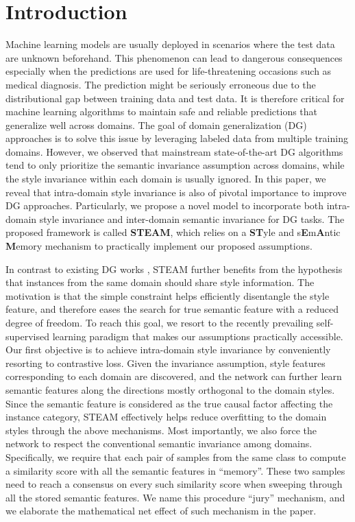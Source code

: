 \documentclass[10pt,twocolumn,letterpaper]{article}
\newcommand{\0}{{\bf 0}}
\begin{document}
\section{Introduction}
Machine learning models are usually deployed in scenarios where the test data are unknown beforehand. This phenomenon can lead to dangerous consequences especially when the predictions are used for life-threatening occasions such as medical diagnosis. The prediction might be seriously erroneous due to the distributional gap between training data and test data. It is therefore critical for machine learning algorithms to maintain safe and reliable predictions that generalize well across domains. The goal of domain generalization (DG) approaches \cite{li2018domain, li2018deep, shankar2018generalizing, zhou2021domain} is to solve this issue by leveraging labeled data from multiple training domains. However, we observed that mainstream state-of-the-art DG algorithms tend to only prioritize the semantic invariance assumption across domains, while the style invariance within each domain is usually ignored. In this paper, we reveal that intra-domain style invariance is also of pivotal importance to improve DG approaches. Particularly, we propose a novel model to incorporate both intra-domain style invariance and inter-domain semantic invariance for DG tasks. The proposed framework is called \textbf{STEAM}, which relies on a \textbf{ST}yle and s\textbf{E}m\textbf{A}ntic \textbf{M}emory mechanism to practically implement our proposed assumptions.

In contrast to existing DG works \cite{carlucci2019domain, zhou2020learning, zhou2021domain}, STEAM further benefits from the hypothesis that instances from the same domain should share style information. The motivation is that the simple constraint helps efficiently disentangle the style feature, and therefore eases the search for true semantic feature with a reduced degree of freedom. To reach this goal, we resort to the recently prevailing self-supervised learning paradigm that makes our assumptions practically accessible. Our first objective is to achieve intra-domain style invariance by conveniently resorting to contrastive loss. Given the invariance assumption, style features corresponding to each domain are discovered, and the network can further learn semantic features along the directions mostly orthogonal to the domain styles. Since the semantic feature is considered as the true causal factor affecting the instance category, STEAM effectively helps reduce overfitting to the domain styles through the above mechanisms. Most importantly, we also force the network to respect the conventional semantic invariance among domains. Specifically, we require that each pair of samples from the same class to compute a similarity score with all the semantic features in ``memory''. These two samples need to reach a consensus on every such similarity score when sweeping through all the stored semantic features. We name this procedure ``jury'' mechanism, and we elaborate the mathematical net effect of such mechanism in the paper.
\end{document}
